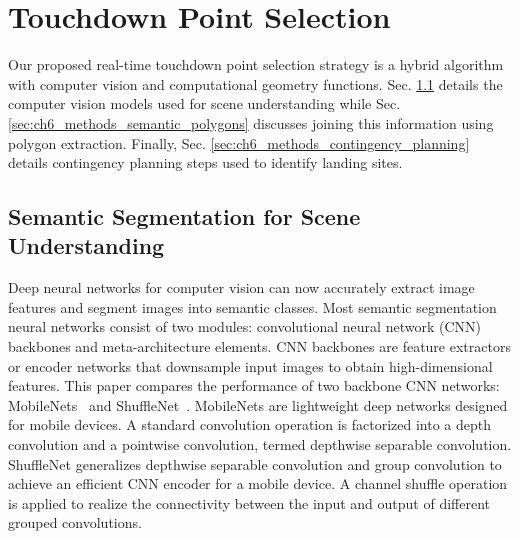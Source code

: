 \section{Touchdown Point Selection}\label{sec:ch6_touchdown_point_selection}

Our proposed real-time touchdown point selection strategy is a hybrid algorithm with computer vision and computational geometry functions. Sec. \ref{sec:ch6_methods_semantic_segmentation} details the computer vision models used for scene understanding while Sec. \ref{sec:ch6_methods_semantic_polygons} discusses joining this information using polygon extraction. Finally, Sec. \ref{sec:ch6_methods_contingency_planning} details contingency planning steps used to identify landing sites.


\subsection{Semantic Segmentation for Scene Understanding}\label{sec:ch6_methods_semantic_segmentation}

Deep neural networks for computer vision can now accurately extract image features and segment images into semantic classes. Most semantic segmentation neural networks consist of two modules: convolutional neural network (CNN) backbones and meta-architecture elements.
CNN backbones are feature extractors or encoder networks that downsample input images to obtain high-dimensional features. This paper compares the performance of two backbone CNN networks: MobileNets~\cite{howard_mobilenets_2017} and ShuffleNet~\cite{zhang_shufflenet_2018}. MobileNets are lightweight deep networks designed for mobile devices. A standard convolution operation is factorized into a depth convolution and a pointwise convolution, termed depthwise separable convolution. ShuffleNet generalizes depthwise separable convolution and group convolution to achieve an efficient CNN encoder for a mobile device. A channel shuffle operation is applied to realize the connectivity between the input and output of different grouped convolutions.

